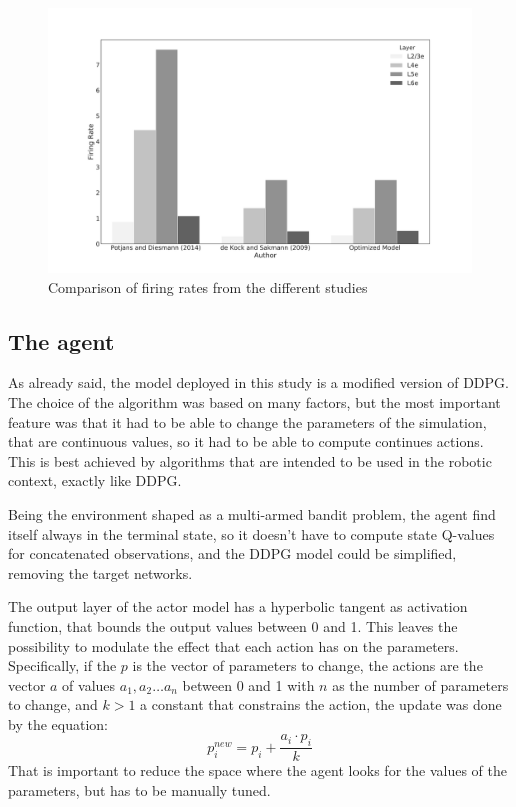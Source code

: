 \begin{figure}[h]
	\raggedleft
	\includegraphics[scale=0.40]{pictures/potjans_barplot.pdf}
	\caption{Comparison of firing rates from the different studies}
	\label{fig:potjans_barplot}
\end{figure}

\subsection{The agent}

As already said, the model deployed in this study is a modified version of DDPG. The choice of the algorithm was based on many factors, but the most important feature was that it had to be able to change the parameters of the simulation, that are continuous values, so it had to be able to compute continues actions. This is best achieved by algorithms that are intended to be used in the robotic context, exactly like DDPG. 

Being the environment shaped as a multi-armed bandit problem, the agent find itself always in the terminal state, so it doesn't have to compute state Q-values for concatenated observations, and the DDPG model could be simplified, removing the target networks.

The output layer of the actor model has a hyperbolic tangent as activation function, that bounds the output values between 0 and 1. This leaves the possibility to modulate the effect that each action has on the parameters. Specifically, if the $p$ is the vector of parameters to change, the actions are the vector $a$ of values $a_1, a_2 \ldots a_n$ between 0 and 1 with $n$ as the number of parameters to change, and $k > 1$ a constant that constrains the action, the update was done by the equation:
\begin{equation}
	p^{new}_i = p_i + \frac{a_i \cdot p_i}{k}
\end{equation}
That is important to reduce the space where the agent looks for the values of the parameters, but has to be manually tuned. 


